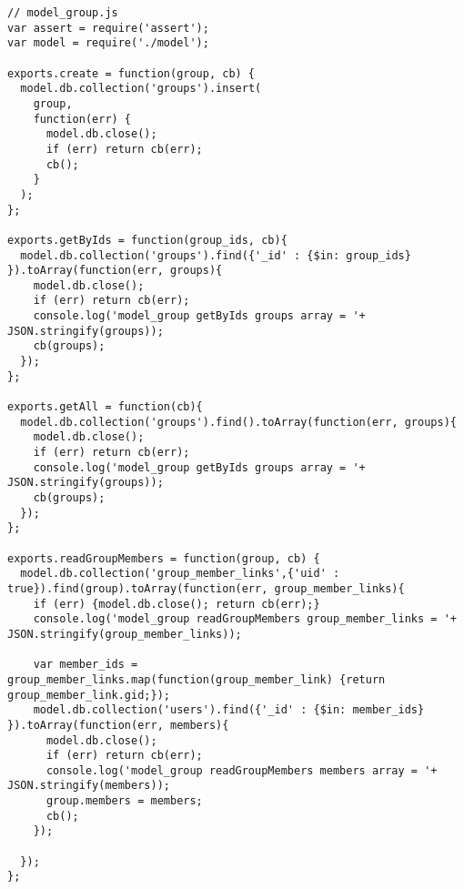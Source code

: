 \small
\lstset{basicstyle=\ttfamily,breaklines=true}
\begin{lstlisting}
// model_group.js
var assert = require('assert');
var model = require('./model');

exports.create = function(group, cb) {
  model.db.collection('groups').insert(
    group,
    function(err) {
      model.db.close();
      if (err) return cb(err); 
      cb();
    }
  );  
};

exports.getByIds = function(group_ids, cb){
  model.db.collection('groups').find({'_id' : {$in: group_ids} }).toArray(function(err, groups){
    model.db.close();
    if (err) return cb(err);
    console.log('model_group getByIds groups array = '+ JSON.stringify(groups));  
    cb(groups);
  });
};

exports.getAll = function(cb){
  model.db.collection('groups').find().toArray(function(err, groups){
    model.db.close();
    if (err) return cb(err);
    console.log('model_group getByIds groups array = '+ JSON.stringify(groups));  
    cb(groups);
  });
};

exports.readGroupMembers = function(group, cb) {
  model.db.collection('group_member_links',{'uid' : true}).find(group).toArray(function(err, group_member_links){
    if (err) {model.db.close(); return cb(err);}
    console.log('model_group readGroupMembers group_member_links = '+ JSON.stringify(group_member_links));
    
    var member_ids = group_member_links.map(function(group_member_link) {return group_member_link.gid;});
    model.db.collection('users').find({'_id' : {$in: member_ids} }).toArray(function(err, members){
      model.db.close();
      if (err) return cb(err);
      console.log('model_group readGroupMembers members array = '+ JSON.stringify(members));  
      group.members = members;
      cb();
    });
    
  });    
};


\end{lstlisting}

